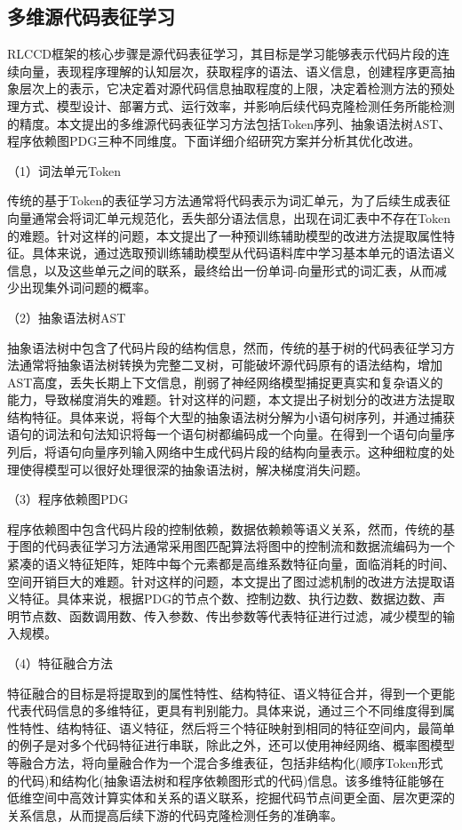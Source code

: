 \subsection{多维源代码表征学习}
\label{subsec:Representation}
RLCCD框架的核心步骤是源代码表征学习，其目标是学习能够表示代码片段的连续向量，表现程序理解的认知层次，获取程序的语法、语义信息，创建程序更高抽象层次上的表示，它决定着对源代码信息抽取程度的上限，决定着检测方法的预处理方式、模型设计、部署方式、运行效率，并影响后续代码克隆检测任务所能检测的精度。本文提出的多维源代码表征学习方法包括Token序列、抽象语法树AST、程序依赖图PDG三种不同维度。下面详细介绍研究方案并分析其优化改进。

（1）词法单元Token

传统的基于Token的表征学习方法通常将代码表示为词汇单元，为了后续生成表征向量通常会将词汇单元规范化，丢失部分语法信息，出现在词汇表中不存在Token的难题。针对这样的问题，本文提出了一种预训练辅助模型的改进方法提取属性特征。具体来说，通过选取预训练辅助模型从代码语料库中学习基本单元的语法语义信息，以及这些单元之间的联系，最终给出一份单词-向量形式的词汇表，从而减少出现集外词问题的概率。

（2）抽象语法树AST

抽象语法树中包含了代码片段的结构信息，然而，传统的基于树的代码表征学习方法通常将抽象语法树转换为完整二叉树，可能破坏源代码原有的语法结构，增加AST高度，丢失长期上下文信息，削弱了神经网络模型捕捉更真实和复杂语义的能力，导致梯度消失的难题。针对这样的问题，本文提出子树划分的改进方法提取结构特征。具体来说，将每个大型的抽象语法树分解为小语句树序列，并通过捕获语句的词法和句法知识将每一个语句树都编码成一个向量。在得到一个语句向量序列后，将语句向量序列输入网络中生成代码片段的结构向量表示。这种细粒度的处理使得模型可以很好处理很深的抽象语法树，解决梯度消失问题。

（3）程序依赖图PDG

程序依赖图中包含代码片段的控制依赖，数据依赖赖等语义关系，然而，传统的基于图的代码表征学习方法通常采用图匹配算法将图中的控制流和数据流编码为一个紧凑的语义特征矩阵，矩阵中每个元素都是高维系数特征向量，面临消耗的时间、空间开销巨大的难题。针对这样的问题，本文提出了图过滤机制的改进方法提取语义特征。具体来说，根据PDG的节点个数、控制边数、执行边数、数据边数、声明节点数、函数调用数、传入参数、传出参数等代表特征进行过滤，减少模型的输入规模。

（4）特征融合方法

特征融合的目标是将提取到的属性特性、结构特征、语义特征合并，得到一个更能代表代码信息的多维特征，更具有判别能力。具体来说，通过三个不同维度得到属性特性、结构特征、语义特征，然后将三个特征映射到相同的特征空间内，最简单的例子是对多个代码特征进行串联，除此之外，还可以使用神经网络、概率图模型等融合方法，将向量融合作为一个混合多维表征，包括非结构化(顺序Token形式的代码)和结构化(抽象语法树和程序依赖图形式的代码)信息。该多维特征能够在低维空间中高效计算实体和关系的语义联系，挖掘代码节点间更全面、层次更深的关系信息，从而提高后续下游的代码克隆检测任务的准确率。

